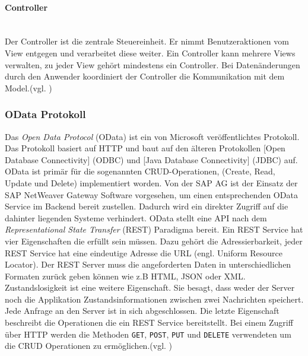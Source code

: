 \paragraph{Controller}$\;$ \\
Der Controller ist die zentrale Steuereinheit. Er nimmt Benutzeraktionen vom View entgegen und verarbeitet diese weiter. Ein Controller kann mehrere Views verwalten, zu jeder View gehört mindestens ein Controller. Bei Datenänderungen durch den Anwender koordiniert der Controller die Kommunikation mit dem Model.(vgl. \cite[S.123f]{AntoEinf2014})

\subsubsection{OData Protokoll}
\glqq Das \textit{Open Data Protocol} (OData) ist ein von Microsoft veröffentlichtes Protokoll. Das Protokoll basiert auf HTTP und baut auf den älteren Protokollen [Open Database Connectivity] (ODBC) und [Java Database Connectivity] (JDBC) auf. OData ist primär für die sogenannten CRUD-Operationen, (Create, Read, Update und Delete) implementiert worden.\grqq{}\cite[S.168]{AntoEinf2014} Von der SAP AG ist der Einsatz der SAP NetWeaver Gateway Software vorgesehen, um einen entsprechenden OData Service im Backend bereit zustellen. Dadurch wird ein direkter Zugriff auf die dahinter liegenden Systeme verhindert. OData stellt eine API nach dem \textit{Representational State Transfer} (REST) Paradigma bereit. Ein REST Service hat vier Eigenschaften die erfüllt sein müssen. Dazu gehört die Adressierbarkeit, jeder REST Service hat eine eindeutige Adresse die URL (engl. Uniform Resource Locator). Der REST Server muss die angeforderten Daten in unterschiedlichen Formaten zurück geben können wie z.B HTML, JSON oder XML. Zustandslosigkeit ist eine weitere Eigenschaft. Sie besagt, dass weder der Server noch die Applikation Zustandsinformationen zwischen zwei Nachrichten speichert. Jede Anfrage an den Server ist in sich abgeschlossen. Die letzte Eigenschaft beschreibt die Operationen die ein REST Service bereitstellt. Bei einem Zugriff über HTTP werden die Methoden \texttt{GET}, \texttt{POST}, \texttt{PUT} und \texttt{DELETE} verwendeten um die CRUD Operationen zu ermöglichen.(vgl. \cite{wikirest})

